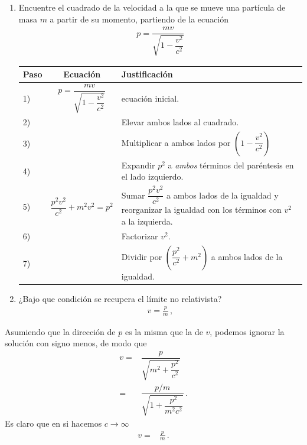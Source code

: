 \documentclass[12pt, a4paper]{article}
\begin{document}
\begin{exercise}[ID=momento-velocidad, subtitle={Velocidad a partir del momento relativista}, tags={banco}]
\begin{enumerate}
    \item Encuentre el cuadrado de la velocidad a la que se mueve una partícula de masa $m$ a partir de su momento, partiendo de la ecuación
\begin{align*}
    p =\dfrac{m v}{\sqrt{1-\dfrac{v^2}{c^2}}}
\end{align*}

\noindent
 \hspace{-1cm}\begin{tabular*}{0.95\textwidth}{l|c|p{9cm}}
   \textbf{Paso} & \textbf{Ecuación}  & \textbf{Justificación} \\\hline
1)     & $p =\dfrac{m v}{\sqrt{1-\dfrac{v^2}{c^2}}}$  & ecuación inicial.\\[20pt]\hline
2) &\phantom{ $p^2  =\dfrac{m^2 v^2}{1-\dfrac{v^2}{c^2}} $}& Elevar ambos lados al cuadrado. \\[20pt]\hline
3) &\phantom{ $p^2\left(1-\dfrac{v^2}{c^2}\right)  =m^2 v^2 $}& Multiplicar a ambos lados por $\left(1-\dfrac{v^2}{c^2}\right)$ \\[5pt]\hline
4) &\phantom{ $p^2-\dfrac{p^2v^2}{c^2}  =m^2 v^2 $}& Expandir $p^2$ a \emph{ambos} términos del paréntesis en el lado izquierdo. \\[5pt]\hline
5) &$  \dfrac{p^2v^2}{c^2} + m^2 v^2 = p^2 $& Sumar $\dfrac{p^2v^2}{c^2}$ a ambos lados de la igualdad y reorganizar la igualdad con los términos con $v^2$ a la izquierda. \\[5pt]\hline
6) &\phantom{ $v^2\left(\dfrac{p^2}{c^2} + m^2\right)= p^2 $}& Factorizar $v^2$. \\[5pt]\hline
7) &\phantom{ $v^2=\dfrac{p^2}{m^2 + \dfrac{p^2}{c^2}}  $}& Dividir por $\left(\dfrac{p^2}{c^2} + m^2\right)$ a ambos lados de la igualdad. \\[20pt]\hline
\end{tabular*}
\item ¿Bajo que condición se recupera el límite no relativista?
\begin{align*}
    v = \frac{p}{m}\,,
\end{align*}
\end{enumerate}
\end{exercise}
\begin{solution}
Asumiendo que la dirección de $p$ es la misma que la de $v$, podemos ignorar la solución con signo menos, de modo que
\begin{align*}
    v=&\dfrac{p}{\sqrt{m^2 + \dfrac{p^2}{c^2}}}\\
    =&\dfrac{p/m}{\sqrt{1 + \dfrac{p^2}{m^2c^2}}}\,.
\end{align*}
Es claro que en si hacemos $c\to \infty$
\begin{align*}
    v =& \frac{p}{m}\,.
\end{align*}
\end{solution}
\end{document}
